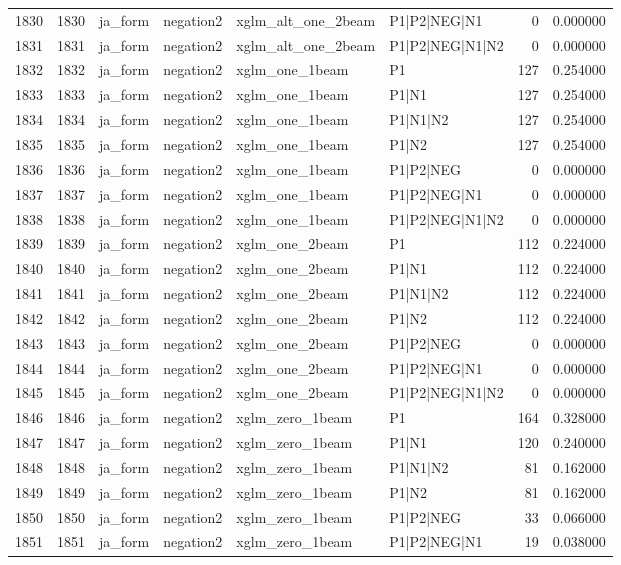 \begin{tabular}{lrllllrr}
1830 & 1830 & ja_form & negation2 & xglm_alt_one_2beam & P1|P2|NEG|N1 & 0 & 0.000000 \\
1831 & 1831 & ja_form & negation2 & xglm_alt_one_2beam & P1|P2|NEG|N1|N2 & 0 & 0.000000 \\
1832 & 1832 & ja_form & negation2 & xglm_one_1beam & P1 & 127 & 0.254000 \\
1833 & 1833 & ja_form & negation2 & xglm_one_1beam & P1|N1 & 127 & 0.254000 \\
1834 & 1834 & ja_form & negation2 & xglm_one_1beam & P1|N1|N2 & 127 & 0.254000 \\
1835 & 1835 & ja_form & negation2 & xglm_one_1beam & P1|N2 & 127 & 0.254000 \\
1836 & 1836 & ja_form & negation2 & xglm_one_1beam & P1|P2|NEG & 0 & 0.000000 \\
1837 & 1837 & ja_form & negation2 & xglm_one_1beam & P1|P2|NEG|N1 & 0 & 0.000000 \\
1838 & 1838 & ja_form & negation2 & xglm_one_1beam & P1|P2|NEG|N1|N2 & 0 & 0.000000 \\
1839 & 1839 & ja_form & negation2 & xglm_one_2beam & P1 & 112 & 0.224000 \\
1840 & 1840 & ja_form & negation2 & xglm_one_2beam & P1|N1 & 112 & 0.224000 \\
1841 & 1841 & ja_form & negation2 & xglm_one_2beam & P1|N1|N2 & 112 & 0.224000 \\
1842 & 1842 & ja_form & negation2 & xglm_one_2beam & P1|N2 & 112 & 0.224000 \\
1843 & 1843 & ja_form & negation2 & xglm_one_2beam & P1|P2|NEG & 0 & 0.000000 \\
1844 & 1844 & ja_form & negation2 & xglm_one_2beam & P1|P2|NEG|N1 & 0 & 0.000000 \\
1845 & 1845 & ja_form & negation2 & xglm_one_2beam & P1|P2|NEG|N1|N2 & 0 & 0.000000 \\
1846 & 1846 & ja_form & negation2 & xglm_zero_1beam & P1 & 164 & 0.328000 \\
1847 & 1847 & ja_form & negation2 & xglm_zero_1beam & P1|N1 & 120 & 0.240000 \\
1848 & 1848 & ja_form & negation2 & xglm_zero_1beam & P1|N1|N2 & 81 & 0.162000 \\
1849 & 1849 & ja_form & negation2 & xglm_zero_1beam & P1|N2 & 81 & 0.162000 \\
1850 & 1850 & ja_form & negation2 & xglm_zero_1beam & P1|P2|NEG & 33 & 0.066000 \\
1851 & 1851 & ja_form & negation2 & xglm_zero_1beam & P1|P2|NEG|N1 & 19 & 0.038000 \\

\end{tabular}
